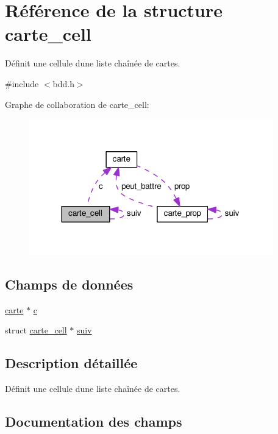 \hypertarget{structcarte__cell}{}\section{Référence de la structure carte\+\_\+cell}
\label{structcarte__cell}


Définit une cellule d\textquotesingle{}une liste chaînée de cartes.  




{\ttfamily \#include $<$bdd.\+h$>$}



Graphe de collaboration de carte\+\_\+cell\+:
\nopagebreak
\begin{figure}[H]
\begin{center}
\leavevmode
\includegraphics[width=300pt]{structcarte__cell__coll__graph}
\end{center}
\end{figure}
\subsection*{Champs de données}
\begin{DoxyCompactItemize}
\item 
\hyperlink{structcarte}{carte} $\ast$ \hyperlink{structcarte__cell_a2c4496b232d881213e41fe630c3843bb}{c}
\item 
struct \hyperlink{structcarte__cell}{carte\+\_\+cell} $\ast$ \hyperlink{structcarte__cell_aa9b3e04e481fb482711d5d66e4e45924}{suiv}
\end{DoxyCompactItemize}


\subsection{Description détaillée}
Définit une cellule d\textquotesingle{}une liste chaînée de cartes. 

\subsection{Documentation des champs}
